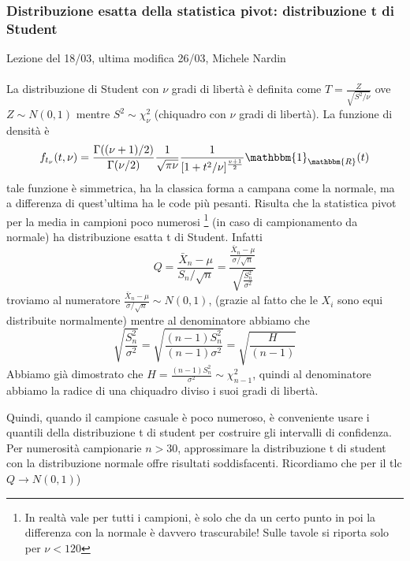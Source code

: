 
\subsubsection{Distribuzione esatta della statistica pivot: distribuzione t di Student}

Lezione del 18/03, ultima modifica 26/03, Michele Nardin
\\
\\
La distribuzione di Student con $\nu$ gradi di libertà è definita come 
$T=\frac{Z}{\sqrt{S^2 / \nu}}$ ove $Z \sim N(0,1)$ mentre $S^2 \sim \chi^2_\nu$ (chiquadro con $\nu$ gradi di libertà).
La funzione di densità è $$f_{t_\nu}(t,\nu)=\frac{\Gamma((\nu + 1)/2)}{\Gamma(\nu / 2)}
\frac{1}{\sqrt{\pi \nu}} \frac{1}{[1+t^2/\nu]^{\frac{v+1}{2}}} \mathbbm{1}_\mathbbm{R} (t)$$
tale funzione è simmetrica, ha la classica forma a campana come la normale, ma a differenza di quest'ultima ha le code più pesanti.
Risulta che la statistica pivot per la media in campioni poco numerosi 
\footnote{In realtà vale per tutti i campioni, è solo che da un certo punto in poi la differenza con la normale è davvero trascurabile! Sulle tavole si riporta solo per $\nu < 120$} (in caso di campionamento da normale) 
ha distribuzione esatta t di Student. Infatti 
$$Q=\frac{\bar{X}_n - \mu}{S_n / \sqrt{n}}=\frac{\frac{\bar{X}_n - \mu}{\sigma / \sqrt{n}}}{\sqrt{\frac{S^2_n}{\sigma^2}}}$$
troviamo al numeratore $\frac{\bar{X}_n - \mu}{\sigma / \sqrt{n}} \sim N(0,1)$, (grazie al fatto che le $X_i$ sono equi distribuite normalmente) 
mentre al denominatore abbiamo che 
$$\sqrt{\frac{S^2_n}{\sigma^2}}= \sqrt{\frac{(n-1)S^2_n}{(n-1) \sigma^2}}= \sqrt{\frac{H}{(n-1)}} $$
Abbiamo già dimostrato che $H=\frac{(n-1)S^2_n}{\sigma^2} \sim \chi^2_{n-1}$, quindi al denominatore abbiamo la radice di una chiquadro diviso i suoi gradi di libertà.

Quindi, quando il campione casuale è poco numeroso, è conveniente usare i quantili della distribuzione t di student per costruire gli intervalli di confidenza. Per numerosità campionarie $n>30$, approssimare la distribuzione t di student con la distribuzione normale offre risultati soddisfacenti. Ricordiamo che per il tlc $Q\rightarrow N(0,1)$)

